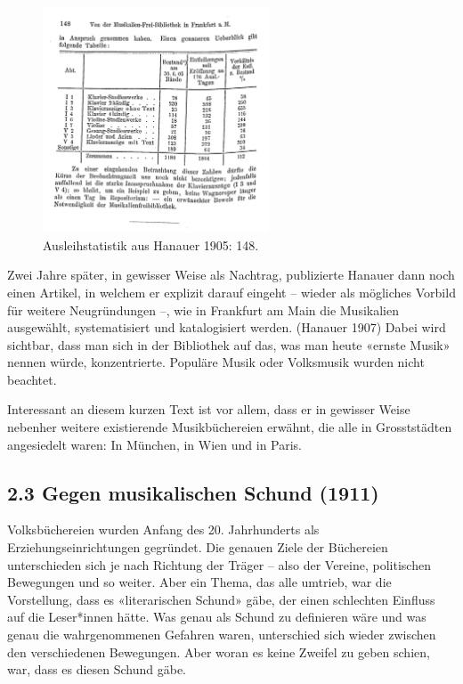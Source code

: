 \documentclass[a4paper,
fontsize=11pt,
oneside,
numbers=noperiodatend,
parskip=half-,
bibliography=totoc,
final
]{scrartcl}
\begin{document}
\begin{figure}[h!]
\centering
\includegraphics[width=0.6\textwidth]{files/Hanauer_1905.jpg}
\caption{Ausleihstatistik aus Hanauer 1905: 148.}
\end{figure}

Zwei Jahre später, in gewisser Weise als Nachtrag, publizierte Hanauer
dann noch einen Artikel, in welchem er explizit darauf eingeht -- wieder
als mögliches Vorbild für weitere Neugründungen --, wie in Frankfurt am
Main die Musikalien ausgewählt, systematisiert und katalogisiert werden.
(Hanauer 1907) Dabei wird sichtbar, dass man sich in der Bibliothek auf
das, was man heute «ernste Musik» nennen würde, konzentrierte. Populäre
Musik oder Volksmusik wurden nicht beachtet.

Interessant an diesem kurzen Text ist vor allem, dass er in gewisser
Weise nebenher weitere existierende Musikbüchereien erwähnt, die alle in
Grosststädten angesiedelt waren: In München, in Wien und in Paris.

\hypertarget{gegen-musikalischen-schund-1911}{%
\subsection{2.3 Gegen musikalischen Schund
(1911)}\label{gegen-musikalischen-schund-1911}}

Volksbüchereien wurden Anfang des 20. Jahrhunderts als
Erziehungseinrichtungen gegründet. Die genauen Ziele der Büchereien
unterschieden sich je nach Richtung der Träger -- also der Vereine,
politischen Bewegungen und so weiter. Aber ein Thema, das alle umtrieb,
war die Vorstellung, dass es «literarischen Schund» gäbe, der einen
schlechten Einfluss auf die Leser*innen hätte. Was genau als Schund zu
definieren wäre und was genau die wahrgenommenen Gefahren waren,
unterschied sich wieder zwischen den verschiedenen Bewegungen. Aber
woran es keine Zweifel zu geben schien, war, dass es diesen Schund gäbe.
\end{document}
